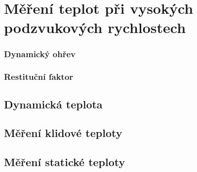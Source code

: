 \section{Měření teplot při vysokých podzvukových rychlostech} \label{sec:mereni-teplot}
    \subsubsection{Dynamický ohřev}
    \subsubsection{Restituční faktor}
    
    \subsection{Dynamická teplota}

    \subsection{Měření klidové teploty}

    \subsection{Měření statické teploty}